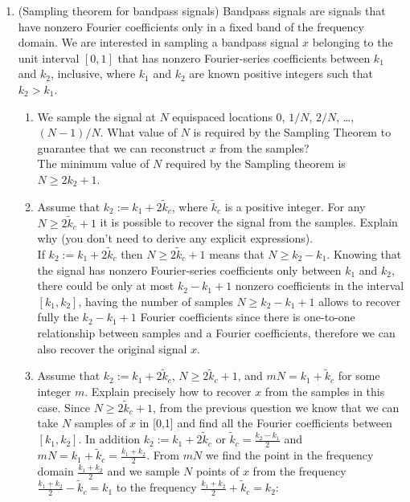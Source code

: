 \documentclass[12pt,twoside]{article}
\begin{document}
\begin{enumerate}
\newpage
   
\item (Sampling theorem for bandpass signals) Bandpass signals are signals that have nonzero Fourier coefficients
only in a fixed band of the frequency domain. We are interested in
sampling a bandpass signal $x$ belonging to the unit interval $[0,1]$
that has nonzero Fourier-series coefficients between $k_1$ and $k_2$,
inclusive, where $k_1$ and $k_2$ are known positive integers such that $k_2 > k_1$. 
\begin{enumerate}
\item We sample the signal at $N$ equispaced locations $0$, $1/N$, $2/N$, \ldots, $(N-1)/N$. What value of $N$ is required by the Sampling Theorem to guarantee that we can reconstruct $x$ from the samples?\\
The minimum value of $N$ required by the Sampling theorem is $N \ge 2 k_2 + 1$.

\item Assume that $k_2:=k_1 + 2\tilde{k}_c$, where $\tilde{k}_c $ is a positive integer. For any $N \geq 2\tilde{k}_c + 1$ it is possible to recover the signal from the samples. Explain why (you don't need to derive any explicit expressions).\\
If  $k_2:=k_1 + 2\tilde{k}_c$ then $N \geq 2\tilde{k}_c + 1$ means that $N \geq k_2 - k_1$. Knowing that the signal has nonzero Fourier-series coefficients only between $k_1$ and $k_2$, there could be only at most $k_2 - k_1 + 1$ nonzero
coefficients in the interval $[k_1, k_2]$, having the number of samples $N \ge k_2 - k_1 + 1$ allows to recover fully the $k_2 - k_1 + 1$ Fourier coefficients since there is one-to-one relationship between samples and
a Fourier coefficients, therefore we can also recover the original signal $x$.

\item Assume that $k_2:=k_1 + 2\tilde{k}_c$, $N\geq 2\tilde{k}_c+1$,
  and $mN = k_1+\tilde{k}_c$ for some integer $m$. Explain precisely how to recover $x$ from the samples in this case.
 Since   $N\geq 2\tilde{k}_c+1$, from the previous question we know that we can take $N$ samples of $x$ in [0,1] and find all the Fourier coefficients between $[k_1, k_2]$. 
 In addition $k_2:=k_1 + 2\tilde{k}_c$ or $\tilde{k}_c = \frac{k_2 - k_1}{2}$ and $mN=k_1 + \tilde{k}_c = \frac{k_1 + k_2}{2}$.
 From $mN$ we find the point in the frequency domain $\frac{k_1 + k_2}{2}$ and we sample $N$ points of $x$ from the frequency $\frac{k_1 + k_2}{2} - \tilde{k}_c = k_1$ to the frequency $\frac{k_1 + k_2}{2} + \tilde{k}_c = k_2$:
 

\end{enumerate}
\end{enumerate}
\end{document}
